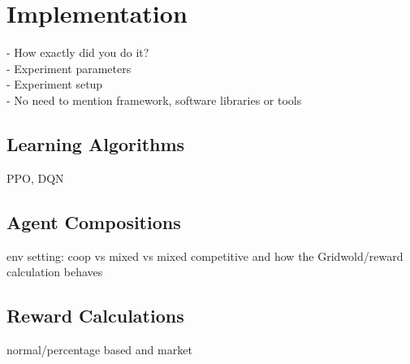 %
%
\chapter{Implementation}\label{sec:Implementation}
- How exactly did you do it? \\
- Experiment parameters \\
- Experiment setup \\
- No need to mention framework, software libraries or tools

\section{Learning Algorithms}
PPO, DQN

\section{Agent Compositions}
env setting: coop vs mixed vs mixed competitive and how the Gridwold/reward calculation behaves

\section{Reward Calculations}
normal/percentage based and market